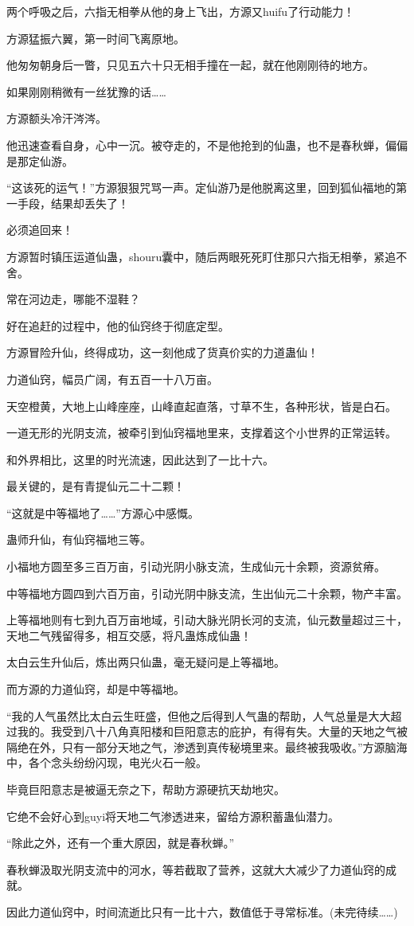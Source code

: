 \begin{this_body}
两个呼吸之后，六指无相拳从他的身上飞出，方源又huifu了行动能力！

方源猛振六翼，第一时间飞离原地。

他匆匆朝身后一瞥，只见五六十只无相手撞在一起，就在他刚刚待的地方。

如果刚刚稍微有一丝犹豫的话……

方源额头冷汗涔涔。

他迅速查看自身，心中一沉。被夺走的，不是他抢到的仙蛊，也不是春秋蝉，偏偏是那定仙游。

“这该死的运气！”方源狠狠咒骂一声。定仙游乃是他脱离这里，回到狐仙福地的第一手段，结果却丢失了！

必须追回来！

方源暂时镇压运道仙蛊，shouru囊中，随后两眼死死盯住那只六指无相拳，紧追不舍。

常在河边走，哪能不湿鞋？

好在追赶的过程中，他的仙窍终于彻底定型。

方源冒险升仙，终得成功，这一刻他成了货真价实的力道蛊仙！

力道仙窍，幅员广阔，有五百一十八万亩。

天空橙黄，大地上山峰座座，山峰直起直落，寸草不生，各种形状，皆是白石。

一道无形的光阴支流，被牵引到仙窍福地里来，支撑着这个小世界的正常运转。

和外界相比，这里的时光流速，因此达到了一比十六。

最关键的，是有青提仙元二十二颗！

“这就是中等福地了……”方源心中感慨。

蛊师升仙，有仙窍福地三等。

小福地方圆至多三百万亩，引动光阴小脉支流，生成仙元十余颗，资源贫瘠。

中等福地方圆四到六百万亩，引动光阴中脉支流，生出仙元二十余颗，物产丰富。

上等福地则有七到九百万亩地域，引动大脉光阴长河的支流，仙元数量超过三十，天地二气残留得多，相互交感，将凡蛊炼成仙蛊！

太白云生升仙后，炼出两只仙蛊，毫无疑问是上等福地。

而方源的力道仙窍，却是中等福地。

“我的人气虽然比太白云生旺盛，但他之后得到人气蛊的帮助，人气总量是大大超过我的。我受到八十八角真阳楼和巨阳意志的庇护，有得有失。大量的天地之气被隔绝在外，只有一部分天地之气，渗透到真传秘境里来。最终被我吸收。”方源脑海中，各个念头纷纷闪现，电光火石一般。

毕竟巨阳意志是被逼无奈之下，帮助方源硬抗天劫地灾。

它绝不会好心到guyi将天地二气渗透进来，留给方源积蓄蛊仙潜力。

“除此之外，还有一个重大原因，就是春秋蝉。”

春秋蝉汲取光阴支流中的河水，等若截取了营养，这就大大减少了力道仙窍的成就。

因此力道仙窍中，时间流逝比只有一比十六，数值低于寻常标准。(未完待续……)

\end{this_body}

